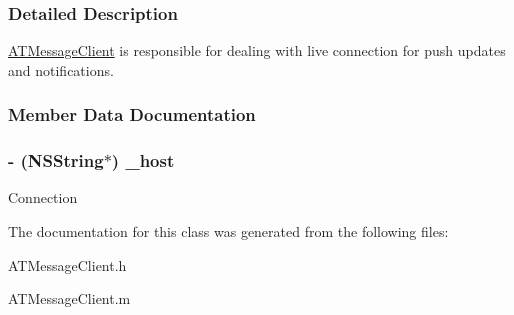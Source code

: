 \subsubsection{Detailed Description}
\hyperlink{interface_a_t_message_client}{ATMessageClient} is responsible for dealing with live connection for push updates and notifications. 

\subsubsection{Member Data Documentation}
\hypertarget{interface_a_t_message_client_a10e7fe2e07ea9c28ca3cc987f85bff10}{
\subsubsection[{\_\-host}]{\setlength{\rightskip}{0pt plus 5cm}-\/ ({\bf NSString}$\ast$) {\bf \_\-host}}}
\label{interface_a_t_message_client_a10e7fe2e07ea9c28ca3cc987f85bff10}
Connection 

The documentation for this class was generated from the following files:\begin{DoxyCompactItemize}
\item 
ATMessageClient.h\item 
ATMessageClient.m\end{DoxyCompactItemize}
